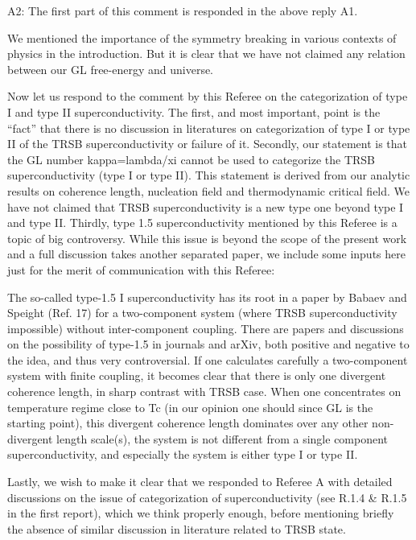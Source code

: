 \documentclass[11pt]{article}
\begin{document}
A2: The first part of this comment is responded in the above reply A1.

We mentioned the importance of the symmetry breaking in various contexts
of physics in the introduction. But it is clear that we have not claimed
any relation between our GL free-energy and universe.

Now let us respond to the comment by this Referee on the categorization
of type I and type II superconductivity. The first, and most important,
point is the ``fact'' that there is no discussion in literatures on
categorization of type I or type II of the TRSB superconductivity or
failure of it. Secondly, our statement is that the GL number
kappa=lambda/xi cannot be used to categorize the TRSB superconductivity
(type I or type II). This statement is derived from our analytic results
on coherence length, nucleation field and thermodynamic critical field.
We have not claimed that TRSB superconductivity is a new type one beyond
type I and type II. Thirdly, type 1.5 superconductivity mentioned by
this Referee is a topic of big controversy. While this issue is beyond
the scope of the present work and a full discussion takes another
separated paper, we include some inputs here just for the merit of
communication with this Referee:

The so-called type-1.5 I superconductivity has its root in a paper by
Babaev and Speight (Ref. 17) for a two-component system (where TRSB
superconductivity impossible) without inter-component coupling. There
are papers and discussions on the possibility of type-1.5 in journals
and arXiv, both positive and negative to the idea, and thus very
controversial. If one calculates carefully a two-component system with
finite coupling, it becomes clear that there is only one divergent
coherence length, in sharp contrast with TRSB case. When one
concentrates on temperature regime close to Tc (in our opinion one
should since GL is the starting point), this divergent coherence length
dominates over any other non-divergent length scale(s), the system is
not different from a single component superconductivity, and especially
the system is either type I or type II.

Lastly, we wish to make it clear that we responded to Referee A with
detailed discussions on the issue of categorization of superconductivity
(see R.1.4 \& R.1.5 in the first report), which we think properly
enough, before mentioning briefly the absence of similar discussion in
literature related to TRSB state.
\end{document}
